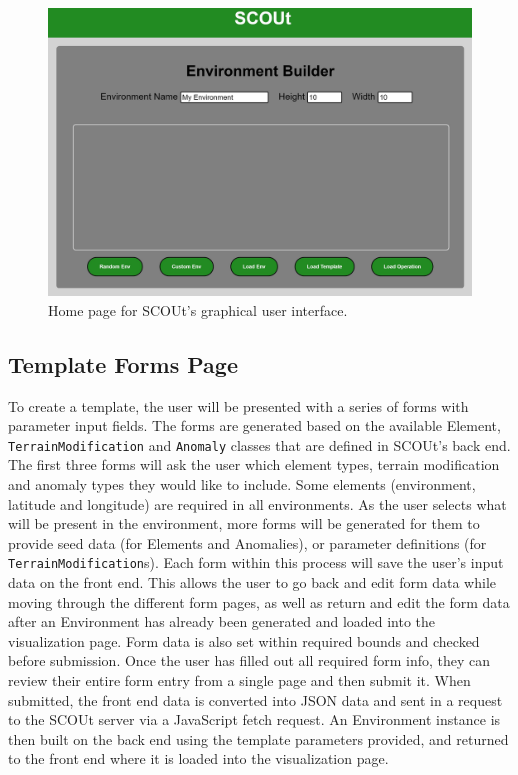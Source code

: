\begin{figure}[H]
  \includegraphics[width=1.0\columnwidth]{Figures/Visualizer/home_page.JPG}
  \caption{Home page for SCOUt's graphical user interface.}
  \label{fig:visualizer_home_page}
\end{figure}

\subsection{Template Forms Page} \label{subsec:template_forms_page}
To create a template, the user will be presented with a series of forms with parameter input fields.
The forms are generated based on the available Element, \texttt{TerrainModification} and \texttt{Anomaly} classes that are defined in SCOUt's back end.
The first three forms will ask the user which element types, terrain modification and anomaly types they would like to include.
Some elements (environment, latitude and longitude) are required in all environments.
As the user selects what will be present in the environment, more forms will be generated for them to provide seed data (for Elements and Anomalies), or parameter definitions (for \texttt{TerrainModification}s).
Each form within this process will save the user’s input data on the front end.
This allows the user to go back and edit form data while moving through the different form pages, as well as return and edit the form data after an Environment has already been generated and loaded into the visualization page.
Form data is also set within required bounds and checked before submission.
Once the user has filled out all required form info, they can review their entire form entry from a single page and then submit it.
When submitted, the front end data is converted into JSON data and sent in a request to the SCOUt server via a JavaScript fetch request.
An Environment instance is then built on the back end using the template parameters provided, and returned to the front end where it is loaded into the visualization page.

